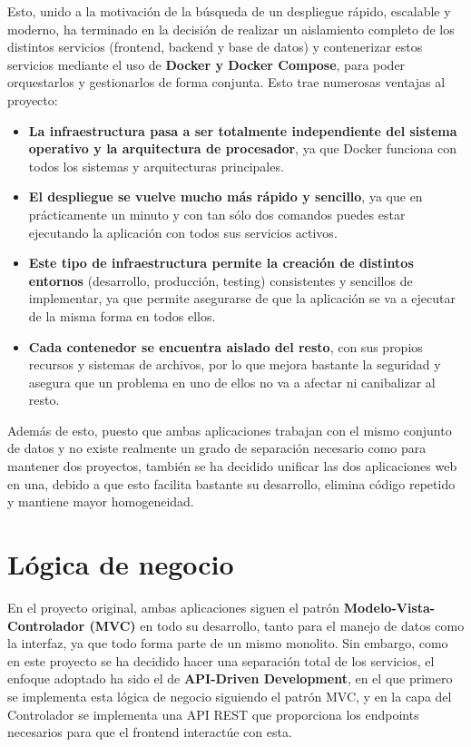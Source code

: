Esto, unido a la motivación de la búsqueda de un despliegue rápido, escalable y moderno, ha terminado en la decisión de realizar un aislamiento completo de los distintos servicios (frontend, backend y base de datos) y contenerizar estos servicios mediante el uso de \textbf{Docker y Docker Compose}, para poder orquestarlos y gestionarlos de forma conjunta. Esto trae numerosas ventajas al proyecto:

\begin{itemize}
  \item \textbf{La infraestructura pasa a ser totalmente independiente del sistema operativo y la arquitectura de procesador}, ya que Docker funciona con todos los sistemas y arquitecturas principales.
  \item \textbf{El despliegue se vuelve mucho más rápido y sencillo}, ya que en prácticamente un minuto y con tan sólo dos comandos puedes estar ejecutando la aplicación con todos sus servicios activos. 
  \item \textbf{Este tipo de infraestructura permite la creación de distintos entornos} (desarrollo, producción, testing) consistentes y sencillos de implementar, ya que permite asegurarse de que la aplicación se va a ejecutar de la misma forma en todos ellos.
  \item \textbf{Cada contenedor se encuentra aislado del resto}, con sus propios recursos y sistemas de archivos, por lo que mejora bastante la seguridad y asegura que un problema en uno de ellos no va a afectar ni canibalizar al resto.
\end{itemize}

Además de esto, puesto que ambas aplicaciones trabajan con el mismo conjunto de datos y no existe realmente un grado de separación necesario como para mantener dos proyectos, también se ha decidido unificar las dos aplicaciones web en una, debido a que esto facilita bastante su desarrollo, elimina código repetido y mantiene mayor homogeneidad.

\section{Lógica de negocio}

En el proyecto original, ambas aplicaciones siguen el patrón \textbf{Modelo-Vista-Controlador (MVC)} en todo su desarrollo, tanto para el manejo de datos como la interfaz, ya que todo forma parte de un mismo monolito. Sin embargo, como en este proyecto se ha decidido hacer una separación total de los servicios, el enfoque adoptado ha sido el de \textbf{API-Driven Development}, en el que primero se implementa esta lógica de negocio siguiendo el patrón MVC, y en la capa del Controlador se implementa una API REST que proporciona los endpoints necesarios para que el frontend interactúe con esta. 

